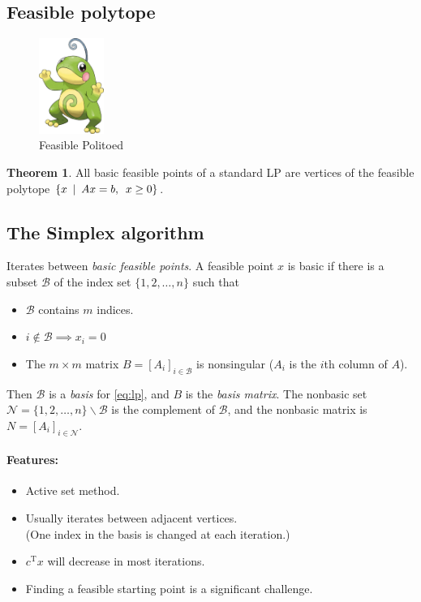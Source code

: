 \documentclass[a4paper, 12pt]{article}
\theoremstyle{definition}
\newcommand{\T}{^{\scriptscriptstyle \text{T}}}
\begin{document}
\subsection{Feasible polytope}
\begin{figure}[H]
	\begin{center}
	\includegraphics[width=60pt]{politoed}
	\caption{Feasible Politoed}
	\end{center}
\end{figure}

\newtheorem*{feasible-polytope}{Theorem}
\begin{feasible-polytope}
	All basic feasible points of a standard LP are vertices of the feasible polytope \(\{ x \enskip | \enskip A x = b, \enskip x \geq 0 \}\).
\end{feasible-polytope}

\subsection{The Simplex algorithm}
Iterates between \emph{basic feasible points}. A feasible point \(x\) is basic if there is a subset \(\mathcal{B}\) of the index set \(\{ 1, 2 , \hdots, n \}\) such that
\begin{itemize}
	\item \(\mathcal{B}\) contains \(m\) indices.
	\item \(i \notin \mathcal{B} \implies x_i = 0\)
	\item The \(m \times m\) matrix \(B = \left[ A_i \right]_{i \in \mathcal{B}}\) is nonsingular (\(A_i\) is the \(i\)th column of \(A\)).
\end{itemize}
Then \(\mathcal{B}\) is a \emph{basis} for \eqref{eq:lp}, and \(B\) is the \emph{basis matrix}. The nonbasic set \(\mathcal{N} = \{ 1, 2 , \hdots, n \}\backslash \mathcal{B}\) is the complement of \(\mathcal{B}\), and the nonbasic matrix is \(N = \left[ A_i \right]_{i \in \mathcal{N}}\).
\paragraph{Features:}
\begin{itemize}
	\item Active set method.
	\item Usually iterates between adjacent vertices.\\
				(One index in the basis is changed at each iteration.)
	\item \(c\T x\) will decrease in most iterations.
	\item Finding a feasible starting point is a significant challenge.
\end{itemize}
\end{document}
